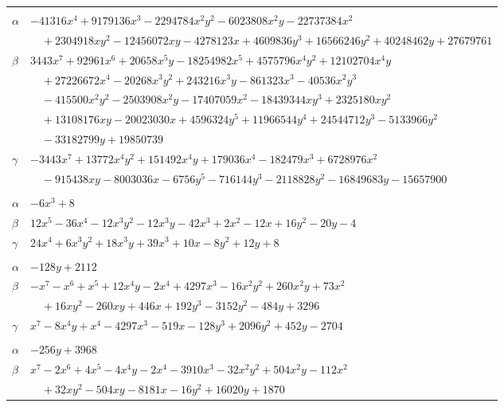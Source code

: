 \documentclass[11pt]{article}
\begin{document}
\begin{longtable}{@{}ll@{}}
\addlinespace[3pt]
\multicolumn{2}{@{}l}{$\{i,j\}=\{16,21\}$, $k_{ij}=2^{4}\cdot 3^{2}$}\\
$\alpha$ & $-41316x^{4}+9179136x^{3}-2294784x^{2}y^{2}-6023808x^{2}y-22737384x^{2}$\\
 & $\quad +2304918xy^{2}-12456072xy-4278123x+4609836y^{3}+16566246y^{2}+40248462y+27679761$\\
$\beta$ & $3443x^{7}+92961x^{6}+20658x^{5}y-18254982x^{5}+4575796x^{4}y^{2}+12102704x^{4}y$\\
 & $\quad +27226672x^{4}-20268x^{3}y^{2}+243216x^{3}y-861323x^{3}-40536x^{2}y^{3}$\\
 & $\quad -415500x^{2}y^{2}-2503908x^{2}y-17407059x^{2}-18439344xy^{3}+2325180xy^{2}$\\
 & $\quad +13108176xy-20023030x+4596324y^{5}+11966544y^{4}+24544712y^{3}-5133966y^{2}$\\
 & $\quad -33182799y+19850739$\\
$\gamma$ & $-3443x^{7}+13772x^{4}y^{2}+151492x^{4}y+179036x^{4}-182479x^{3}+6728976x^{2}$\\
 & $\quad -915438xy-8003036x-6756y^{5}-716144y^{3}-2118828y^{2}-16849683y-15657900$\\
\addlinespace[3pt]
\multicolumn{2}{@{}l}{$\{i,j\}=\{16,27\}$, $k_{ij}=2^{3}$}\\
$\alpha$ & $-6x^{3}+8$\\
$\beta$ & $12x^{5}-36x^{4}-12x^{3}y^{2}-12x^{3}y-42x^{3}+2x^{2}-12x+16y^{2}-20y-4$\\
$\gamma$ & $24x^{4}+6x^{3}y^{2}+18x^{3}y+39x^{3}+10x-8y^{2}+12y+8$\\
\addlinespace[3pt]
\multicolumn{2}{@{}l}{$\{i,j\}=\{17,19\}$, $k_{ij}=2^{7}\cdot 3\cdot 11$}\\
$\alpha$ & $-128y+2112$\\
$\beta$ & $-x^{7}-x^{6}+x^{5}+12x^{4}y-2x^{4}+4297x^{3}-16x^{2}y^{2}+260x^{2}y+73x^{2}$\\
 & $\quad +16xy^{2}-260xy+446x+192y^{3}-3152y^{2}-484y+3296$\\
$\gamma$ & $x^{7}-8x^{4}y+x^{4}-4297x^{3}-519x-128y^{3}+2096y^{2}+452y-2704$\\
\addlinespace[3pt]
\multicolumn{2}{@{}l}{$\{i,j\}=\{17,20\}$, $k_{ij}=2^{10}\cdot 3\cdot 7$}\\
$\alpha$ & $-256y+3968$\\
$\beta$ & $x^{7}-2x^{6}+4x^{5}-4x^{4}y-2x^{4}-3910x^{3}-32x^{2}y^{2}+504x^{2}y-112x^{2}$\\
 & $\quad +32xy^{2}-504xy-8181x-16y^{2}+16020y+1870$\\

\end{longtable}
\end{document}
